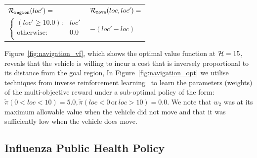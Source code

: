 {\footnotesize 
    \abovedisplayskip=10pt
    \belowdisplayskip=0pt
    \renewcommand{\arraystretch}{1.5}
    \begin{tabular}{ll}    
        $ \mathcal{R}_{\mathtt{region}}(loc') = $ &  $ \mathcal{R}_{\mathtt{move}}(loc, loc') =  $ \\
        \qquad $ \begin{cases}
        (loc' \geq 10.0 ) : & loc' \\
        \text{otherwise} : & 0.0 \\
        \end{cases} $ & \qquad $ - (loc' - loc)  $\\
    \end{tabular}
} 

Figure~\ref{fig:navigation_vf}, which shows the optimal value function at {\footnotesize$ \mathcal{H} = 15 $}, 
reveals that the vehicle is willing to incur a cost that is inversely proportional to its distance from the goal region,
In Figure~\ref{fig:navigation_opt} we utilise techniques from inverse reinforcement learning~\cite{Ng_ICML_2000} to learn the parameters (weights) of the multi-objective reward under a sub-optimal policy of the form: {\footnotesize $ \tilde{\pi}(0 < loc < 10) = 5.0,  \tilde{\pi}(loc < 0 \,\mathrm{or}\, loc > 10) = 0.0$}. We note that {\footnotesize $ w_2 $} was at its maximum allowable value when the vehicle did not move and that it was sufficiently low when the vehicle does move. 

\subsection{Influenza Public Health Policy}
\label{sec:results_influenza}


